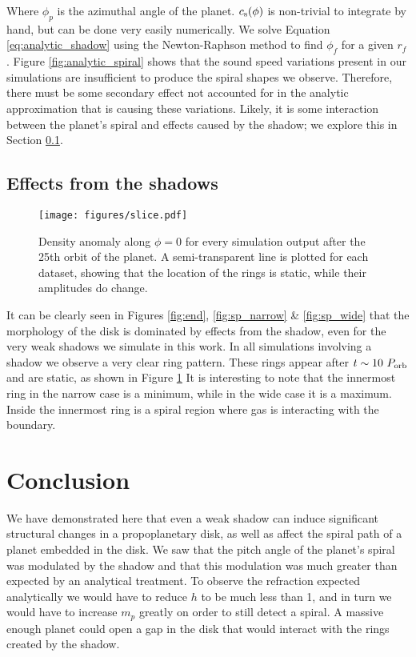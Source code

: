 \documentclass[twocolumn]{aastex631}
\begin{document}
Where $\phi_p$ is the azimuthal angle of the planet.
$c_{\rm s}(\phi)$ is non-trivial to integrate by hand, but can be done very easily numerically. We solve Equation \ref{eq:analytic_shadow}
using the Newton-Raphson method to find $\phi_f$ for a given $r_f$. Figure \ref{fig:analytic_spiral} shows that the sound speed variations
present in our simulations are insufficient to produce the spiral shapes we observe. Therefore, there must be some secondary effect not accounted for
in the analytic approximation that is causing these variations. Likely, it is some interaction between the planet's spiral and effects caused by the
shadow; we explore this in Section \ref{subsec:effect_shadow}.

\subsection{Effects from the shadows}
\label{subsec:effect_shadow}

\begin{figure}
    \centering
    \texttt{[image: figures/slice.pdf]}
    \caption{
        Density anomaly along $\phi = 0$ for every simulation output after the 25th orbit of the planet. A semi-transparent line
        is plotted for each dataset, showing that the location of the rings is static, while their amplitudes do change.
    }
    \label{fig:slice}
\end{figure}

It can be clearly seen in Figures \ref{fig:end}, \ref{fig:sp_narrow} \& \ref{fig:sp_wide} that the morphology of the disk is dominated
by effects from the shadow, even for the very weak shadows we simulate in this work. In all simulations involving a shadow we observe a very clear
ring pattern. These rings appear after $t\sim10~P_{\rm orb}$ and are static, as shown in Figure \ref{fig:slice} It is interesting to note that
the innermost ring in the narrow case is a minimum, while in the wide case it is a maximum. Inside the innermost ring is a spiral region where gas
is interacting with the boundary.

\pagebreak

\section{Conclusion}
\label{sec:conclusion}

We have demonstrated here that even a weak shadow can induce significant structural changes in a propoplanetary disk, as well as affect the spiral path of
a planet embedded in the disk. We saw that the pitch angle of the planet's spiral was modulated by the shadow and that this modulation
was much greater than expected by an analytical treatment. To observe the refraction expected analytically we would have to reduce $h$ to be much less than 1,
and in turn we would have to increase $m_p$ greatly on order to still detect a spiral. A massive enough planet could open a gap in the disk that would interact with
the rings created by the shadow.
\end{document}
